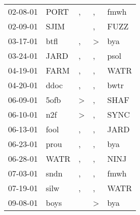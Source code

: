 \begin{supertabular}{p{0.07\textwidth}p{0.06\textwidth}p{0.02\textwidth}p{0.02\textwidth}p{0.06\textwidth}}
          02-08-01\textsuperscript{} &           PORT\textsuperscript{} &                , &                , &           fmwh\textsuperscript{} \\
          02-09-01\textsuperscript{} &           SJIM\textsuperscript{} &                  &                , &           FUZZ\textsuperscript{} \\
          03-17-01\textsuperscript{} &           btfl\textsuperscript{} &                , &     \textgreater &            bya\textsuperscript{} \\
          03-24-01\textsuperscript{} &           JARD\textsuperscript{} &                , &                , &           psol\textsuperscript{} \\
          04-19-01\textsuperscript{} &           FARM\textsuperscript{} &                , &                , &           WATR\textsuperscript{} \\
          04-20-01\textsuperscript{} &           ddoc\textsuperscript{} &                , &                , &           bwtr\textsuperscript{} \\
          06-09-01\textsuperscript{} &           5ofb\textsuperscript{} &     \textgreater &                , &           SHAF\textsuperscript{} \\
          06-10-01\textsuperscript{} &            n2f\textsuperscript{} &     \textgreater &                , &           SYNC\textsuperscript{} \\
          06-13-01\textsuperscript{} &           fool\textsuperscript{} &                , &                , &           JARD\textsuperscript{} \\
          06-23-01\textsuperscript{} &           prou\textsuperscript{} &                , &                , &            bya\textsuperscript{} \\
          06-28-01\textsuperscript{} &           WATR\textsuperscript{} &                , &                , &           NINJ\textsuperscript{} \\
          07-03-01\textsuperscript{} &           sndn\textsuperscript{} &                , &                , &           fmwh\textsuperscript{} \\
          07-19-01\textsuperscript{} &           silw\textsuperscript{} &                , &                , &           WATR\textsuperscript{} \\
          09-08-01\textsuperscript{} &           boys\textsuperscript{} &                  &     \textgreater &            bya\textsuperscript{} \\

\end{supertabular}
